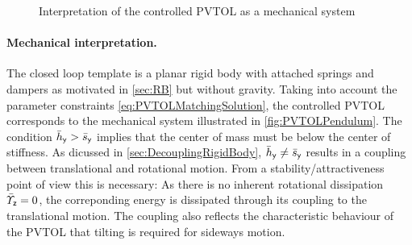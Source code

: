 \begin{figure}
 \centering
 
 \caption{Interpretation of the controlled PVTOL as a mechanical system} 
 \label{fig:PVTOLPendulum}
\end{figure}

\paragraph{Mechanical interpretation.}
The closed loop template is a planar rigid body with attached springs and dampers as motivated in \autoref{sec:RB} but without gravity.
Taking into account the parameter constraints \eqref{eq:PVTOLMatchingSolution}, the controlled PVTOL corresponds to the mechanical system illustrated in \autoref{fig:PVTOLPendulum}.
The condition $\bar{h}_{\mathsf{y}} > \bar{s}_{\mathsf{y}}$ implies that the center of mass must be below the center of stiffness.
As dicussed in \autoref{sec:DecouplingRigidBody}, $\bar{h}_{\mathsf{y}} \neq \bar{s}_{\mathsf{y}}$ results in a coupling between translational and rotational motion.
From a stability/attractiveness point of view this is necessary: As there is no inherent rotational dissipation $\bar{\varUpsilon}_{\mathsf{z}} = 0$, the correponding energy is dissipated through its coupling to the translational motion.
The coupling also reflects the characteristic behaviour of the PVTOL that tilting is required for sideways motion.



